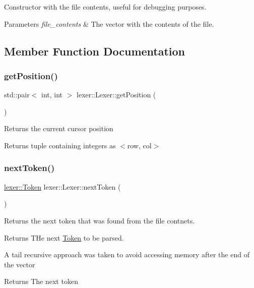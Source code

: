Constructor with the file contents, useful for debugging purposes. 
\begin{DoxyParams}{Parameters}
{\em file\+\_\+contents} & The vector with the contents of the file. \\
\hline
\end{DoxyParams}


\subsection{Member Function Documentation}
\mbox{\label{classlexer_1_1Lexer_add05c7c77f92ad5a8f91123ecebec71d}} 
\subsubsection{\texorpdfstring{get\+Position()}{getPosition()}}
{\footnotesize\ttfamily std\+::pair$<$ int, int $>$ lexer\+::\+Lexer\+::get\+Position (\begin{DoxyParamCaption}{ }\end{DoxyParamCaption})}

Returns the current cursor position \begin{DoxyReturn}{Returns}
tuple containing integers as $<$row, col$>$ 
\end{DoxyReturn}
\mbox{\label{classlexer_1_1Lexer_ab44ae44ee3256fbc79b33a63b3b9bcde}} 
\subsubsection{\texorpdfstring{next\+Token()}{nextToken()}}
{\footnotesize\ttfamily \hyperlink{classlexer_1_1Token}{lexer\+::\+Token} lexer\+::\+Lexer\+::next\+Token (\begin{DoxyParamCaption}{ }\end{DoxyParamCaption})}

Returns the next token that was found from the file contnets. \begin{DoxyReturn}{Returns}
T\+He next \hyperlink{classlexer_1_1Token}{Token} to be parsed.
\end{DoxyReturn}
A tail recursive approach was taken to avoid accessing memory after the end of the vector \begin{DoxyReturn}{Returns}
The next token 
\end{DoxyReturn}

